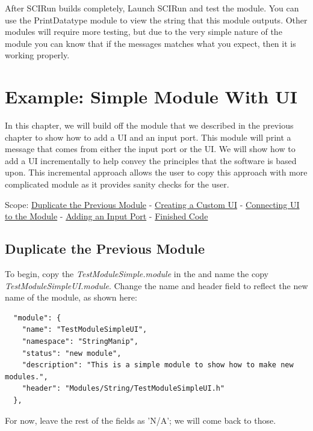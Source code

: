 \documentclass[fleqn,11pt,openany]{book}
\begin{document}
After SCIRun builds completely, Launch SCIRun and test the module.  
You can use the PrintDatatype module to view the string that this module outputs. 
Other modules will require more testing, but due to the very simple nature of the module you can know that if the messages matches what you expect, then it is working properly.  


\chapter{Example: Simple Module With UI}
\label{sec:ex_UI}

\begin{introduction}
In this chapter, we will build off the module that we described in the previous chapter to show how to add a UI and an input port.  
This module will print a message that comes from either the input port or the UI.  
We will show how to add a UI incrementally to help convey the principles that the software is based upon.
This incremental approach allows the user to copy this approach with more complicated module as it provides sanity checks for the user.

Scope: \hyperref[sec:duplicate]{Duplicate the Previous Module} - \hyperref[sec:addUI]{Creating a Custom UI} -
\hyperref[connectUI]{Connecting UI to the Module} - \hyperref[sec:addinput]{Adding an Input Port} - \hyperref[sec:finished]{Finished Code}
\end{introduction}

\section{Duplicate the Previous Module}
\label{sec:duplicate}

To begin, copy the \emph{TestModuleSimple.module} in the \emph{} and name the copy \emph{TestModuleSimpleUI.module}.
Change the name and header field to reflect the new name of the module, as shown here:
\begin{verbatim}
  "module": {
    "name": "TestModuleSimpleUI",
    "namespace": "StringManip",
    "status": "new module",
    "description": "This is a simple module to show how to make new modules.",
    "header": "Modules/String/TestModuleSimpleUI.h"
  },
\end{verbatim}
For now, leave the rest of the fields as 'N/A'; we will come back to those.  
\end{document}

